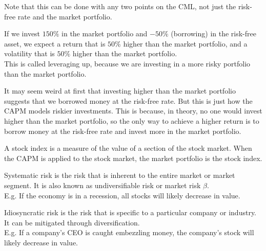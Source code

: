 \begin{lemma}
    Note that this can be done with any two points on the CML, not just the risk-free rate and the market portfolio.
\end{lemma}

\begin{proposition}
    [Leveraging Up]
    If we invest $150\%$ in the market portfolio and $-50\%$ (borrowing) in the risk-free asset, we expect a return that is $50\%$ higher than the market portfolio, and a volatility that is $50\%$ higher than the market portfolio.\\
    This is called leveraging up, because we are investing in a more risky portfolio than the market portfolio.\\
\end{proposition}


\begin{remark}
    It may seem weird at first that investing higher than the market portfolio suggests that we borrowed money at the risk-free rate. But this is just how the CAPM models riskier investments. This is because, in theory, no one would invest higher than the market portfolio, so the only way to achieve a higher return is to borrow money at the risk-free rate and invest more in the market portfolio.\\
\end{remark}

\begin{definition}
    A stock index is a measure of the value of a section of the stock market. When the CAPM is applied to the stock market, the market portfolio is the stock index.\\
\end{definition}

\begin{definition}
    Systematic risk is the risk that is inherent to the entire market or market segment. It is also known as undiversifiable risk or market risk $\beta$.\\
    E.g. If the economy is in a recession, all stocks will likely decrease in value.\\
\end{definition}

\begin{definition}
    Idiosyncratic risk is the risk that is specific to a particular company or industry. It can be mitigated through diversification.\\
    E.g. If a company's CEO is caught embezzling money, the company's stock will likely decrease in value.\\
\end{definition}

